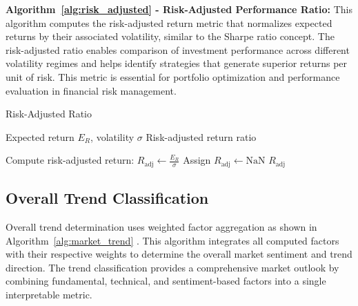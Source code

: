 \documentclass[3p,times,procedia]{elsarticle}
\begin{document}
\textbf{Algorithm~\ref{alg:risk_adjusted} - Risk-Adjusted Performance Ratio:} This algorithm computes the risk-adjusted return metric that normalizes expected returns by their associated volatility, similar to the Sharpe ratio concept. The risk-adjusted ratio enables comparison of investment performance across different volatility regimes and helps identify strategies that generate superior returns per unit of risk. This metric is essential for portfolio optimization and performance evaluation in financial risk management.

\begin{algorithm}[H]
\caption{Risk-Adjusted Ratio}
\label{alg:risk_adjusted}
\begin{algorithmic}[1]
    \Require Expected return $E_R$, volatility $\sigma$
    \Ensure Risk-adjusted return ratio
    
        \State Compute risk-adjusted return: $R_{\text{adj}} \gets \frac{E_R}{\sigma}$
    \Else
        \State Assign $R_{\text{adj}} \gets \text{NaN}$
    \EndIf
    \State \Return $R_{\text{adj}}$
\end{algorithmic}
\end{algorithm}

\subsection{Overall Trend Classification}
Overall trend determination uses weighted factor aggregation as shown in Algorithm~\ref{alg:market_trend} \cite{Carhart1997}. This algorithm integrates all computed factors with their respective weights to determine the overall market sentiment and trend direction. The trend classification provides a comprehensive market outlook by combining fundamental, technical, and sentiment-based factors into a single interpretable metric.
\end{document}

